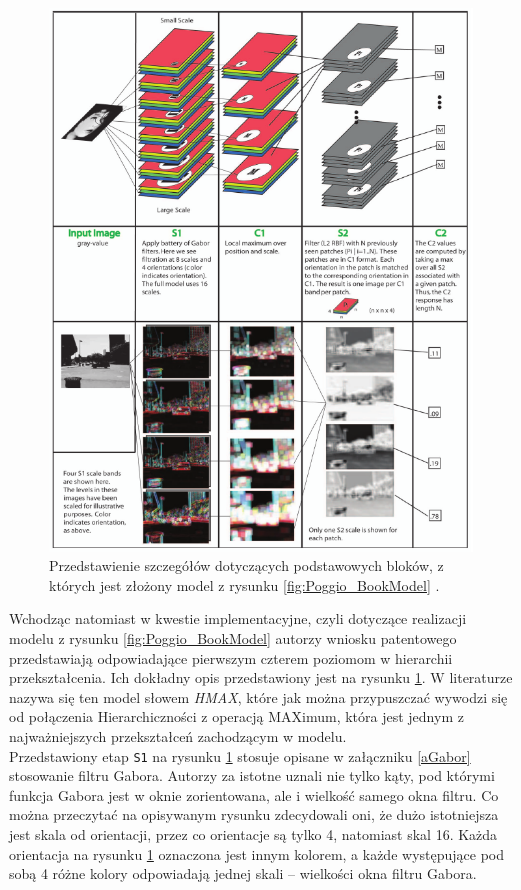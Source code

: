 \begin{figure}[ht]
	\centering
	\includegraphics[width=\textwidth]{images/Poggio_model_implementation.png}
	\caption{Przedstawienie szczegółów dotyczących podstawowych bloków, z których jest złożony model z rysunku \ref{fig:Poggio_BookModel} \cite{Serre2007}.}
	\label{fig:HMax_model}
\end{figure}

Wchodząc natomiast w kwestie implementacyjne, czyli dotyczące realizacji modelu z rysunku \ref{fig:Poggio_BookModel} autorzy wniosku patentowego przedstawiają odpowiadające pierwszym czterem poziomom w hierarchii przekształcenia. Ich dokładny opis przedstawiony jest na rysunku \ref{fig:HMax_model}. W literaturze nazywa się ten model słowem \textit{HMAX}, które jak można przypuszczać wywodzi się od połączenia Hierarchiczności z operacją MAXimum, która jest jednym z najważniejszych przekształceń zachodzącym w modelu.\\

Przedstawiony etap \texttt{S1} na rysunku \ref{fig:HMax_model} stosuje opisane w załączniku \ref{aGabor} stosowanie filtru Gabora. Autorzy za istotne uznali nie tylko kąty, pod którymi funkcja Gabora jest w oknie zorientowana, ale i wielkość samego okna filtru. Co można przeczytać na opisywanym rysunku zdecydowali oni, że dużo istotniejsza jest skala od orientacji, przez co orientacje są tylko 4, natomiast skal 16. Każda orientacja na rysunku \ref{fig:HMax_model} oznaczona jest innym kolorem, a każde występujące pod sobą 4 różne kolory odpowiadają jednej skali -- wielkości okna filtru Gabora.\\

